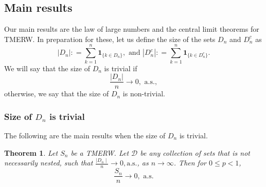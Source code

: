 \documentclass{article}
\numberwithin{equation}{section}
\newtheorem{theorem}{Theorem}[section]
\newtheorem{remark}{Remark}
\newcommand{\1}{\mathbf{1}}
\newcommand{\0}{\mathbf{0}}
\newcommand{\bone}{\mathbf{1}}
\begin{document}
\subsection{Main results}
\label{SubSec: Main_results}
Our main results are the law of large numbers and the central limit theorems for TMERW. In preparation for these, let us define the size of the sets $D_n$ and $D_n^c$ as 
\begin{equation}
\label{Eq: size_D}
|D_n|: = \sum_{k=1}^n \bone_{\{k \in D_n\}}, \text{ and }
|D^c_n|: = \sum_{k=1}^n \bone_{\{k \in D^c_n\}}.
\end{equation}
We will say that the size of $D_n$ is trivial if 
\begin{equation}
\label{Eq: size_D_n_0}
\frac{|D_n|}{n} \longrightarrow 0, \text{ a.s.}, 
\end{equation}
otherwise, we say that the size of $D_n$ is non-trivial.
\subsubsection{ Size of $D_n$ is trivial}
\label{Sec: D_n_size_trivial}
The following are the main results when the size of $D_n$ is trivial.
\begin{theorem}
\label{Thm: SLLN_non-nested} 
Let $S_n$ be a TMERW. 
Let $\mathcal{D}$ be any collection of sets that is not necessarily nested, such that $\frac{\mid D_n \mid }{n} \rightarrow 0, \text{a.s.}$, as $n \to \infty$. Then for $0 \le p<1$,
\begin{equation}
\label{Eq: SLLN_Dn_goes_to_zero}
\frac{S_n}{n}\longrightarrow 0, \text{ a.s.}
\end{equation}  
\end{theorem}

\end{document}
